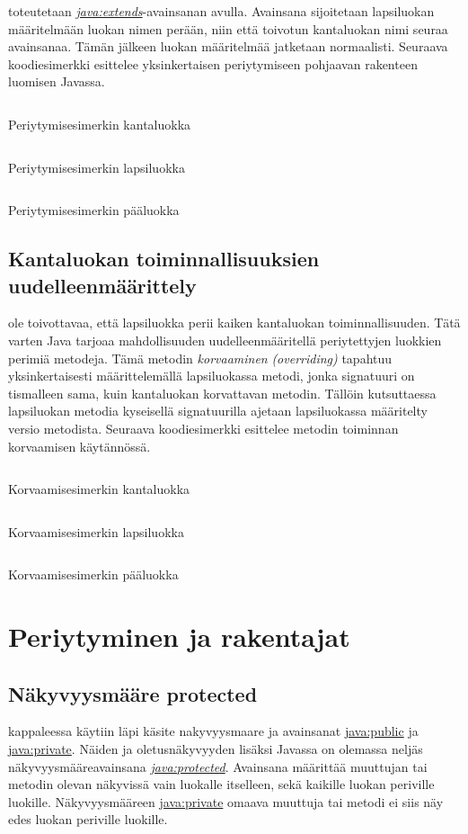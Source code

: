 \documentclass{tufte-book}
\newcommand{\eng}[1]{\textit{(#1)}}
\newcommand{\new}[1]{\textit{\gls{#1}}}
\newcommand{\neweng}[2]{\new{#1} \eng{#2}}
\newcommand{\java}[1]{\underline{\gls{java:#1}}}
\newcommand{\newjava}[1]{\textit{\java{#1}}}
\newcommand{\code}[3]{
\begin{listing}
    \inputminted{java}{OhjelmointiopasEsimerkit/src/#1/#2.java}
    \caption{#3}
    \label{Java-#1-#2}
\end{listing}
}
\begin{document}
 toteutetaan \newjava{extends}-avainsanan avulla. Avainsana
sijoitetaan lapsiluokan määritelmään luokan nimen perään, niin että toivotun kantaluokan nimi
seuraa avainsanaa. Tämän jälkeen luokan määritelmää jatketaan normaalisti. Seuraava koodiesimerkki
esittelee yksinkertaisen periytymiseen pohjaavan rakenteen luomisen Javassa.

\code{week6/basicinheritanceexample}{Parent}{Periytymisesimerkin kantaluokka}
\code{week6/basicinheritanceexample}{Child}{Periytymisesimerkin lapsiluokka}
\code{week6/basicinheritanceexample}{BasicInheritanceExample}{Periytymisesimerkin pääluokka}

\subsection{Kantaluokan toiminnallisuuksien uudelleenmäärittely}
\label{overriding}

 ole toivottavaa, että lapsiluokka perii kaiken kantaluokan toiminnallisuuden.
Tätä varten Java tarjoaa mahdollisuuden uudelleenmääritellä periytettyjen luokkien perimiä
metodeja. Tämä metodin \neweng{korvaaminen}{overriding} tapahtuu yksinkertaisesti määrittelemällä
lapsiluokassa metodi, jonka \gls{signatuuri} on tismalleen sama, kuin kantaluokan korvattavan
metodin. Tällöin kutsuttaessa lapsiluokan metodia kyseisellä signatuurilla ajetaan lapsiluokassa
määritelty versio metodista. Seuraava koodiesimerkki esittelee metodin toiminnan korvaamisen
käytännössä.

\code{week6/overridingexample}{Parent}{Korvaamisesimerkin kantaluokka}
\code{week6/overridingexample}{Child}{Korvaamisesimerkin lapsiluokka}
\code{week6/overridingexample}{OverridingExample}{Korvaamisesimerkin pääluokka}

\section{Periytyminen ja rakentajat}
\label{superprotected}

\subsection{Näkyvyysmääre protected}
\label{protected}

 kappaleessa  käytiin läpi käsite
\gls{nakyvyysmaare} ja avainsanat \java{public} ja \java{private}. Näiden ja oletusnäkyvyyden
lisäksi Javassa on olemassa neljäs näkyvyysmääreavainsana \newjava{protected}. Avainsana määrittää
muuttujan tai metodin olevan näkyvissä vain luokalle itselleen, sekä kaikille luokan periville
luokille. Näkyvyysmääreen \java{private} omaava muuttuja tai metodi ei siis näy edes luokan
periville luokille.
\end{document}
